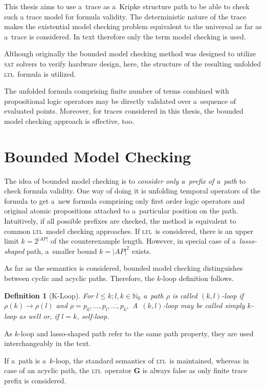 \documentclass[12pt,twoside,draft]{fithesis}
\newcommand{\ltl}{\textsc{ltl}~}
\newcommand{\mNatural}{\mathbb{N}}
\newcommand{\bG}{\mathbf{G}}
\newtheorem{mydef}{Definition}
\begin{document}
This thesis aims to use a~trace as a~Kripke structure path to be able
to check such a trace model for formula validity. The deterministic
nature of the trace makes the existential model checking problem
equivalent to the universal as far as a~trace is considered.
In text therefore only the term model checking is used.

Although originally\cite{biere} the bounded model checking method was
designed to utilize \textsc{sat} solvers to verify hardware design,
here, the structure of the resulting unfolded \ltl formula is utilized.

The unfolded formula comprising finite number of terms combined with
propositional logic operators may be directly validated over a~sequence
of evaluated points. Moreover, for traces considered in this thesis,
the bounded model checking approach is effective, too.

\section{Bounded Model Checking}
The idea of bounded model checking is to \emph{consider only a~prefix
of a~path} to check formula validity. One way of doing it is unfolding
temporal operators of the formula to get a~new formula comprising only
first order logic operators and original atomic propositions attached
to a~particular position on the path. Intuitively, if all possible
prefixes are checked, the method is equivalent to common \ltl model
checking approaches. If \ltl is considered, there is an upper
limit $k=2^{|AP|}$ of the counterexample length\cite{biere}. However, in
special case of a~\emph{lasso-shaped} path, a~smaller bound $k={|AP|}^2$
exists\cite{biere}.

As far as the semantics is considered, bounded model checking
distinguishes between cyclic and acyclic paths. Therefore, the $k$-loop
definition follows.
\begin{mydef}[K-Loop]
For $l\leq k;l,k\in\mNatural_0$ a~path $\rho$ is called $(k,l)$-loop
if $\rho(k)\rightarrow\rho(l)$ and
$\rho=p_0,\dotsc,\overline{p_{l},\dotsc,p_{k},}$
A~$(k,l)$-loop may be called simply $k$-loop as well or, if $l=k$,
self-loop.
\end{mydef}
As $k$-loop and lasso-shaped path refer to the same path property, they
are used interchangeably in the text.

If a~path is a~$k$-loop, the standard semantics of \ltl is maintained,
whereas in case of an acyclic path, the \ltl operator $\bG$ is always
false as only finite trace prefix is considered.
\end{document}
